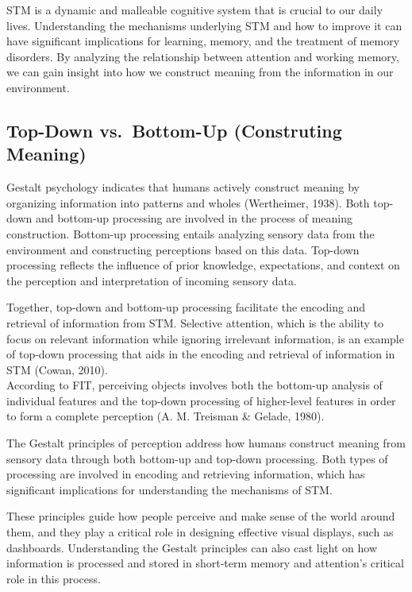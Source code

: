 \documentclass[print]{nuthesis}
\begin{document}
STM is a dynamic and malleable cognitive system that is crucial to our daily lives.
Understanding the mechanisms underlying STM and how to improve it can have significant implications for learning, memory, and the treatment of memory disorders.
By analyzing the relationship between attention and working memory, we can gain insight into how we construct meaning from the information in our environment.

\hypertarget{top-down-vs.-bottom-up-construting-meaning}{%
\subsection{Top-Down vs.~Bottom-Up (Construting Meaning)}\label{top-down-vs.-bottom-up-construting-meaning}}

Gestalt psychology indicates that humans actively construct meaning by organizing information into patterns and wholes (Wertheimer, 1938).
Both top-down and bottom-up processing are involved in the process of meaning construction.
Bottom-up processing entails analyzing sensory data from the environment and constructing perceptions based on this data.
Top-down processing reflects the influence of prior knowledge, expectations, and context on the perception and interpretation of incoming sensory data.

Together, top-down and bottom-up processing facilitate the encoding and retrieval of information from STM.
Selective attention, which is the ability to focus on relevant information while ignoring irrelevant information, is an example of top-down processing that aids in the encoding and retrieval of information in STM (Cowan, 2010).\\
According to FIT, perceiving objects involves both the bottom-up analysis of individual features and the top-down processing of higher-level features in order to form a complete perception (A. M. Treisman \& Gelade, 1980).

The Gestalt principles of perception address how humans construct meaning from sensory data through both bottom-up and top-down processing.
Both types of processing are involved in encoding and retrieving information, which has significant implications for understanding the mechanisms of STM.

These principles guide how people perceive and make sense of the world around them, and they play a critical role in designing effective visual displays, such as dashboards.
Understanding the Gestalt principles can also cast light on how information is processed and stored in short-term memory and attention's critical role in this process.
\end{document}
